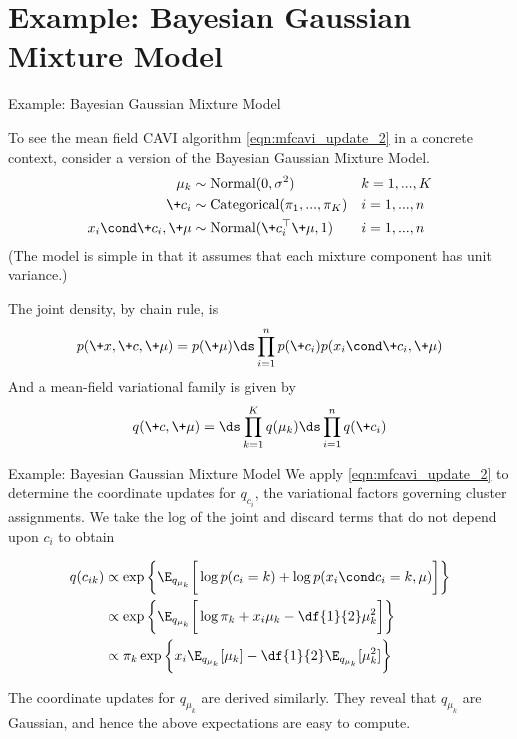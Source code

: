 \documentclass[10pt]{beamer}
\begin{document}
\section{Example: Bayesian Gaussian Mixture Model}
\begin{frame}{Example: Bayesian Gaussian Mixture Model}

To see the mean field CAVI algorithm \eqref{eqn:mfcavi_update_2} in a concrete context, consider a version of the Bayesian Gaussian Mixture Model.  
\begin{align*}
\mu_k & \sim \text{Normal}(0, \sigma^2) && k = 1,..., K\\
\+c_i & \sim \text{Categorical}(\pi_1, ..., \pi_K) && i=1, ... ,n \\
x_i \cond \+c_i, \+\mu & \sim \text{Normal}(\+c_i^\top \+\mu, 1) && i = 1,..., n
\end{align*}
\scriptsize (The model is simple in that it assumes that each mixture component has unit variance.) \normalsize 

\pause 
The joint density, by chain rule, is
\[ p(\+x,\+c,\+\mu) = p(\+\mu) \ds\prod_{i=1}^n p(\+c_i) p(x_i \cond \+c_i, \+\mu) \]
\pause 
And a mean-field variational family is given by 
\[  q(\+c, \+\mu) = \ds\prod_{k=1}^K q(\mu_k) \ds\prod_{i=1}^n q(\+c_i) \]

\end{frame}

\begin{frame}{Example: Bayesian Gaussian Mixture Model}
We apply \eqref{eqn:mfcavi_update_2} to determine the coordinate updates for $q_{c_i}$, the variational factors governing cluster assignments.   We take the log of the joint and discard terms that do not depend upon $c_i$ to obtain

\begin{align*}
q(c_{ik}) & \propto \exp \bigg\{ \E_{q_{\mu_k}} \bigg[  \log p(c_i =k) + \log p(x_i \cond c_i=k, \mu) \bigg] \bigg\} \\
& \propto \exp \bigg\{ \E_{q_{\mu_k}} \bigg[ \log \pi_k + x_i \mu_k - \df{1}{2} \mu_k^2 \bigg] \bigg\} \\
& \propto \pi_k \exp \bigg\{ x_i \E_{q_{\mu_k}} [\mu_k] - \df{1}{2}  \E_{q_{\mu_k}} [ \mu_k^2] \bigg\} \\
\end{align*}

The coordinate updates for $q_{\mu_k}$ are derived similarly.  They reveal that $q_{\mu_k}$ are Gaussian, and hence the above expectations are easy to compute. 

\end{frame}
\end{document}
